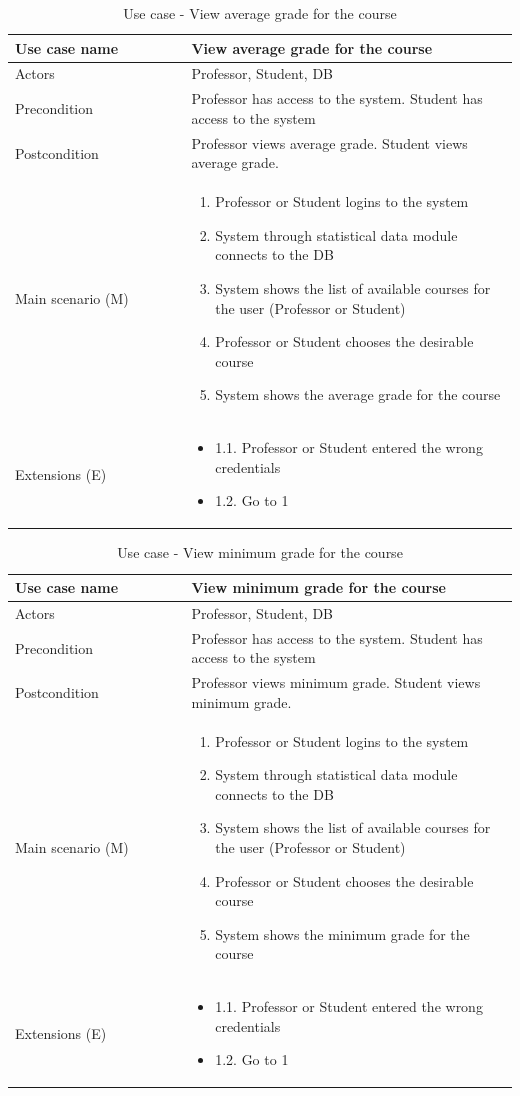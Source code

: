 \documentclass[12pt]{article}
\newcommand\tabularhead[1]{
\begin{table}[h]
  \caption{Use case - #1}
  \begin{tabular}{|p{0.35\linewidth}|p{0.65\linewidth}|}
    \hline
    \textbf{Use case name} & \textbf{#1} \\
    \hline}
\newcommand\addrow[2]{#1 &#2\\ \hline}
\newcommand\adddoublerow[2]{\begin{minipage}[t][][t]{2.5cm}#1\end{minipage}%
    &\begin{minipage}[t][][t]{\linewidth}
     \begin{itemize}\setlength{\itemsep}{0pt}%
        #2     
     \end{itemize}
     \end{minipage}\\ \hline}
\newcommand\addmulrow[2]{ \begin{minipage}[t][][t]{2.5cm}#1\end{minipage}%
     &\begin{minipage}[t][][t]{\linewidth}
      \begin{enumerate}\setlength{\itemsep}{0pt}%
        #2   
      \end{enumerate}
      \end{minipage}\\ \hline}
\newenvironment{usecase}{\tabularhead}
{\hline\end{tabular}\end{table}}
\begin{document}
\begin{usecase}{View average grade for the course}
    \addrow{Actors}{Professor, Student, DB}
    \addrow{Precondition}{Professor has access to the system. Student has access to the system}
    \addrow{Postcondition}{Professor views average grade. Student views average grade.}
    \addmulrow{Main scenario (M)}{
        \item Professor or Student logins to the system
        \item System through statistical data module connects to the DB
        \item System shows the list of available courses for the user (Professor or Student)
        \item Professor or Student chooses the desirable course
        \item System shows the average grade for the course
    }
    \adddoublerow{Extensions (E)}{
        \item[] 1.1. Professor or Student entered the wrong credentials
        \item[] 1.2. Go to 1
    }
\end{usecase}
\newpage
\begin{usecase}{View minimum grade for the course}
    \addrow{Actors}{Professor, Student, DB}
    \addrow{Precondition}{Professor has access to the system. Student has access to the system}
    \addrow{Postcondition}{Professor views minimum grade. Student views minimum grade.}
    \addmulrow{Main scenario (M)}{
        \item Professor or Student logins to the system
        \item System through statistical data module connects to the DB
        \item System shows the list of available courses for the user (Professor or Student)
        \item Professor or Student chooses the desirable course
        \item System shows the minimum grade for the course
    }
    \adddoublerow{Extensions (E)}{
        \item[] 1.1. Professor or Student entered the wrong credentials
        \item[] 1.2. Go to 1
    }
\end{usecase}
\end{document}
